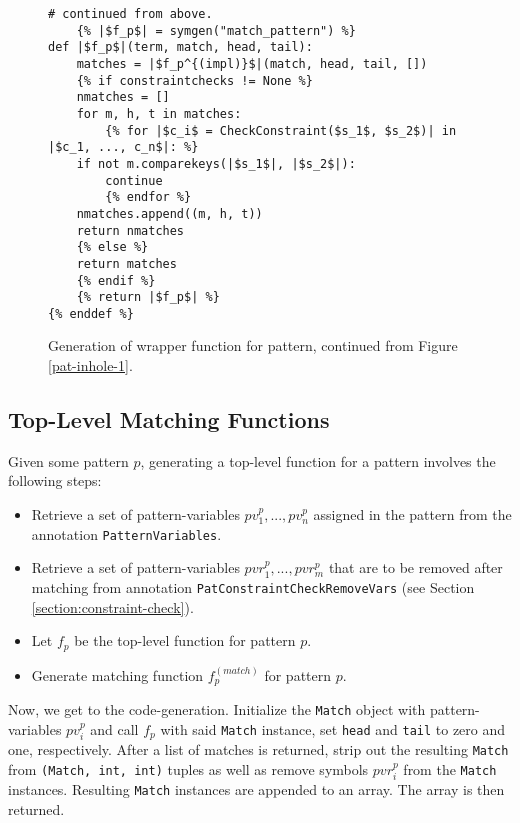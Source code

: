 \begin{figure}[!htb]
\begin{verbatim}
# continued from above.
	{% |$f_p$| = symgen("match_pattern") %}
def |$f_p$|(term, match, head, tail):
	matches = |$f_p^{(impl)}$|(match, head, tail, [])
	{% if constraintchecks != None %}
	nmatches = []
	for m, h, t in matches:
		{% for |$c_i$ = CheckConstraint($s_1$, $s_2$)| in |$c_1, ..., c_n$|: %}
	if not m.comparekeys(|$s_1$|, |$s_2$|):
		continue
		{% endfor %}
	nmatches.append((m, h, t))
	return nmatches
	{% else %}
	return matches
	{% endif %}
	{% return |$f_p$| %}
{% enddef %}
\end{verbatim}
\caption{Generation of wrapper function for \PatternInHoleNoArg \space pattern, continued from Figure \ref{pat-inhole-1}.}
\label{pat-inhole-2}
\end{figure}

\subsection{Top-Level Matching Functions}
Given some pattern $p$, generating a top-level function for a pattern involves the following steps:

\begin{itemize}
\item Retrieve a set of pattern-variables $pv_1^{p}, ..., pv_n^{p}$ assigned in the pattern from the annotation \texttt{PatternVariables}.
\item Retrieve a set of pattern-variables $pvr_1^{p}, ..., pvr_m^{p}$ that are to be removed after matching from annotation \texttt{PatConstraintCheckRemoveVars} (see Section \ref{section:constraint-check}).
\item Let $f_p$ be the top-level function for pattern $p$.
\item Generate matching function $f_p^{(match)}$ for pattern $p$.
\end{itemize}

Now, we get to the code-generation. Initialize the \texttt{Match} object with pattern-variables $pv_i^{p}$ and call $f_p$ with said \texttt{Match} instance, set \texttt{head} and \texttt{tail} to zero and one, respectively. After a list of matches is returned, strip out the resulting \texttt{Match} from \texttt{(Match, int, int)}  tuples as well as remove symbols $pvr_i^{p}$ from the \texttt{Match} instances. Resulting \texttt{Match} instances are appended to an array. The array is then returned.


